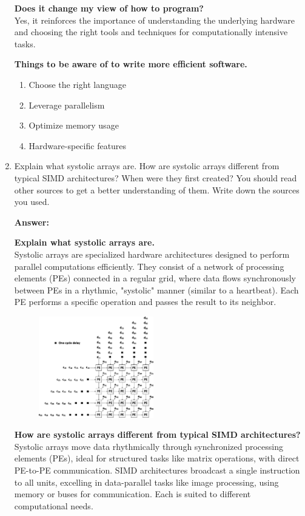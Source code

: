 \documentclass[a4paper,12pt]{article}
\begin{document}
\begin{enumerate}
    \textbf{Does it change my view of how to program?}\\
    Yes, it reinforces the importance of understanding the underlying hardware and choosing the right tools and techniques for computationally intensive tasks.

    \textbf{Things to be aware of to write more efficient software.}
    \begin{enumerate}
        \item Choose the right language
        \item Leverage parallelism
        \item Optimize memory usage
        \item Hardware-specific features
    \end{enumerate}

    \item Explain what systolic arrays are. How are systolic arrays different from typical SIMD architectures? When were they first created? You should read other sources to get a better understanding of them. Write down the sources you used.

    \textbf{Answer:}

    \textbf{Explain what systolic arrays are.}\\
    Systolic arrays are specialized hardware architectures designed to perform parallel computations efficiently. They consist of a network of processing elements (PEs) connected in a regular grid, where data flows synchronously between PEs in a rhythmic, "systolic" manner (similar to a heartbeat). Each PE performs a specific operation and passes the result to its neighbor.
    \begin{figure}[h]
        \includegraphics[width=5cm]{55-Systolic-array-architecture.png}
        \centering
    \end{figure}

    \textbf{How are systolic arrays different from typical SIMD architectures?}\\
    Systolic arrays move data rhythmically through synchronized processing elements (PEs), ideal for structured tasks like matrix operations, with direct PE-to-PE communication. SIMD architectures broadcast a single instruction to all units, excelling in data-parallel tasks like image processing, using memory or buses for communication. Each is suited to different computational needs.


\end{enumerate}
\end{document}
